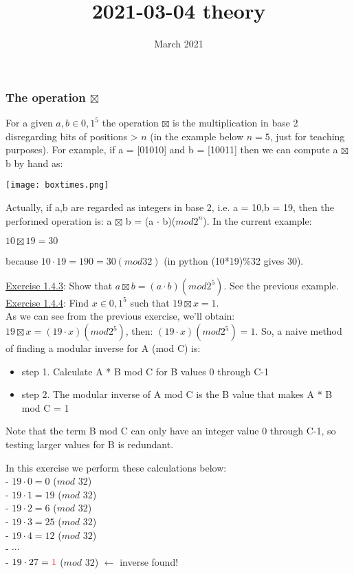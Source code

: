 \documentclass{article}
\title{2021-03-04 theory}
\author{}
\date{March 2021}
\begin{document}
\setcounter{section}{1}
\setcounter{subsection}{4}

\maketitle

\subsubsection{The operation $\boxtimes$}
For a given $a, b \in {0,1}^5$ the operation $\boxtimes$ is the multiplication in base 2 disregarding bits of positions > $n$ (in the example below $n = 5$, just for teaching purposes). For example, if a = [01010] and b = [10011] then we can compute a $\boxtimes$ b by hand as:

\begin{center}
\texttt{[image: boxtimes.png]}
\end{center}

Actually, if a,b are regarded as integers in base 2, i.e. a = 10,b = 19, then the performed operation is: a $\boxtimes$ b = (a $\cdot$ b)($mod 2^n$). In the current example:

\begin{center}
    $10 \boxtimes 19 = 30$
\end{center}

because $10 \cdot 19 = 190 = 30 (mod 32)$ (in python (10*19)\%32 gives 30).

\underline{Exercise 1.4.3}: Show that $a \boxtimes b = (a \cdot b)(mod 2^5)$. See the previous example.\\

\underline{Exercise 1.4.4}: Find $x \in {0,1}^5$ such that $19 \boxtimes x = 1$.\\
As we can see from the previous exercise, we'll obtain: $19 \boxtimes x = (19 \cdot x)(mod 2^5)$, then: $(19 \cdot x)(mod 2^5) = 1$. So, a naive method of finding a modular inverse for A (mod C) is:
\begin{itemize}
    \item step 1. Calculate A * B mod C for B values 0 through C-1
    \item step 2. The modular inverse of A mod C is the B value that makes A * B mod C = 1
\end{itemize}
Note that the term B mod C can only have an integer value 0 through C-1, so testing larger values for B is redundant.

In this exercise we perform these calculations below:\\
- $19 \cdot 0 = 0$ ($mod$ $32$)\\
- $19 \cdot 1 = 19$ ($mod$ $32$)\\
- $19 \cdot 2 = 6$ ($mod$ $32$)\\
- $19 \cdot 3 = 25$ ($mod$ $32$)\\
- $19 \cdot 4 = 12$ ($mod$ $32$)\\
-   $\cdots$ \\
- $19 \cdot 27 = \textcolor{red}{1}$ ($mod$ $32$) $\longleftarrow$ inverse found!\\
\end{document}
